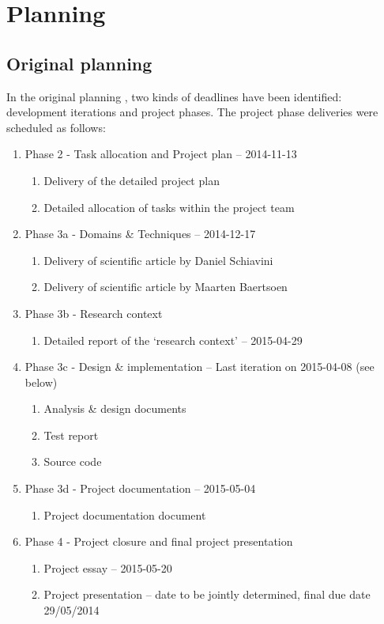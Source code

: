 
\section{Planning}
\label{sec:planning}

\subsection{Original planning}
In the original planning \cite{plan}, two kinds of deadlines have been identified: development iterations and project phases.
The project phase deliveries were scheduled as follows:
 \begin{enumerate}
	\item Phase 2 - Task allocation and Project plan			-- 	2014-11-13
 	\begin{enumerate}
		\item Delivery of the detailed project plan 			
		\item Detailed allocation of tasks within the project team 
	\end {enumerate}
	\item Phase 3a - Domains \& Techniques					-- 	2014-12-17
 	\begin{enumerate}
		\item Delivery of scientific article by Daniel Schiavini
		\item Delivery of scientific article by Maarten Baertsoen
	\end {enumerate}
 	\item Phase 3b - Research context
 	\begin{enumerate}
		\item Detailed report of the `research context'  		-- 	2015-04-29
	\end {enumerate}
 	\item Phase 3c - Design \& implementation				-- Last iteration on 2015-04-08 (see below)
 	\begin{enumerate}
		\item Analysis \& design documents
		\item Test report
		\item Source code
	\end {enumerate}
 	\item Phase 3d - Project documentation					-- 	2015-05-04
 	\begin{enumerate}
		\item Project documentation document	
	\end {enumerate}
	\item Phase 4 - Project closure and final project presentation
 	\begin{enumerate}
		\item Project essay							-- 	2015-05-20
		\item Project presentation						-- 	date to be jointly determined, final due date 29/05/2014
	\end {enumerate}
\end {enumerate}
